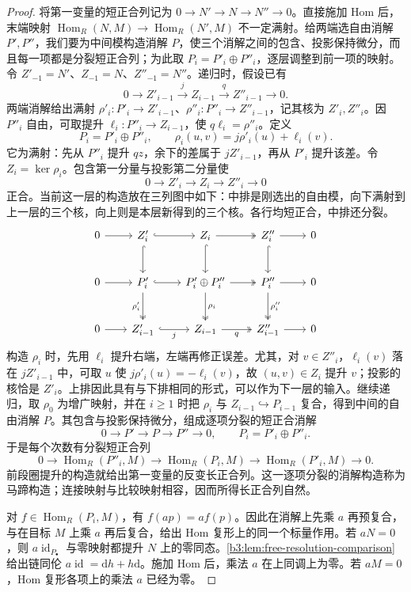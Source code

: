 \begin{proof}
	将第一变量的短正合列记为 \(0\rightarrow N'\rightarrow N\rightarrow N''\rightarrow0\)。直接施加 Hom 后，末端映射 \(\operatorname{Hom}_R(N,M)\to\operatorname{Hom}_R(N',M)\) 不一定满射。给两端选自由消解 \(P',P''\)，我们要为中间模构造消解 \(P\)，使三个消解之间的包含、投影保持微分，而且每一项都是分裂短正合列；为此取 \(P_i=P'_i\oplus P''_i\)，逐层调整到前一项的映射。令 \(Z'_{-1}=N'\)、\(Z_{-1}=N\)、\(Z''_{-1}=N''\)。递归时，假设已有
	\[
		0\longrightarrow Z'_{i-1}\xrightarrow{j}Z_{i-1} \xrightarrow{q}Z''_{i-1}\longrightarrow0.
	\]
	两端消解给出满射 \(\rho'_i:P'_i\rightarrow Z'_{i-1}\)、\(\rho''_i:P''_i\rightarrow Z''_{i-1}\)，记其核为 \(Z'_i,Z''_i\)。因 \(P''_i\) 自由，可取提升 \(\ell_i:P''_i\rightarrow Z_{i-1}\)，使 \(q\ell_i=\rho''_i\)。定义
	\[
		P_i=P'_i\oplus P''_i,\qquad \rho_i(u,v)=j\rho'_i(u)+\ell_i(v).
	\]
	它为满射：先从 \(P''_i\) 提升 \(qz\)，余下的差属于 \(jZ'_{i-1}\)，再从 \(P'_i\) 提升该差。令 \(Z_i=\ker\rho_i\)。包含第一分量与投影第二分量使
	\[
		0\longrightarrow Z'_i\longrightarrow Z_i\longrightarrow Z''_i\longrightarrow0
	\]
	正合。当前这一层的构造放在三列图中如下：中排是刚选出的自由模，向下满射到上一层的三个核，向上则是本层新得到的三个核。各行均短正合，中排还分裂。
	\[
		\begin{tikzcd}[column sep=2em,row sep=2.5em]
			0\arrow[r]&Z'_i\arrow[r,hook]\arrow[d,hook] &Z_i\arrow[r,two heads]\arrow[d,hook] &Z''_i\arrow[r]\arrow[d,hook]&0\\
			0\arrow[r]&P'_i\arrow[r,hook]\arrow[d,two heads,"\rho'_i"'] &P'_i\oplus P''_i\arrow[r,two heads]\arrow[d,two heads,"\rho_i"] &P''_i\arrow[r]\arrow[d,two heads,"\rho''_i"]&0\\
			0\arrow[r]&Z'_{i-1}\arrow[r,hook,"j"'] &Z_{i-1}\arrow[r,two heads,"q"'] &Z''_{i-1}\arrow[r]&0
		\end{tikzcd}
	\]
	构造 \(\rho_i\) 时，先用 \(\ell_i\) 提升右端，左端再修正误差。尤其，对 \(v\in Z''_i\)，\(\ell_i(v)\) 落在 \(jZ'_{i-1}\) 中，可取 \(u\) 使 \(j\rho'_i(u)=-\ell_i(v)\)，故 \((u,v)\in Z_i\) 提升 \(v\)；投影的核恰是 \(Z'_i\)。上排因此具有与下排相同的形式，可以作为下一层的输入。继续递归，取 \(\rho_0\) 为增广映射，并在 \(i\ge1\) 时把 \(\rho_i\) 与 \(Z_{i-1}\hookrightarrow P_{i-1}\) 复合，得到中间的自由消解 \(P\)。其包含与投影保持微分，组成逐项分裂的短正合消解
	\[
		0\longrightarrow P'\longrightarrow P\longrightarrow P''\longrightarrow0, \qquad P_i=P'_i\oplus P''_i.
	\]
	于是每个次数有分裂短正合列
	\[
		0\longrightarrow\operatorname{Hom}_R(P''_i,M) \longrightarrow\operatorname{Hom}_R(P_i,M) \longrightarrow\operatorname{Hom}_R(P'_i,M)\longrightarrow0.
	\]
	前段圈提升的构造就给出第一变量的反变长正合列。这一逐项分裂的消解构造称为马蹄构造；连接映射与比较映射相容，因而所得长正合列自然。

	对 \(f\in\operatorname{Hom}_R(P_i,M)\)，有 \(f(ap)=af(p)\)。因此在消解上先乘 \(a\) 再预复合，与在目标 \(M\) 上乘 \(a\) 再后复合，给出 Hom 复形上的同一个标量作用。若 \(aN=0\)，则 \(a\operatorname{id}_{P_\bullet}\) 与零映射都提升 \(N\) 上的零同态。\cref{b3:lem:free-resolution-comparison}给出链同伦 \(a\operatorname{id}=\mathrm{d}h+h\mathrm{d}\)。施加 Hom 后，乘法 \(a\) 在上同调上为零。若 \(aM=0\)，Hom 复形各项上的乘法 \(a\) 已经为零。
\end{proof}

